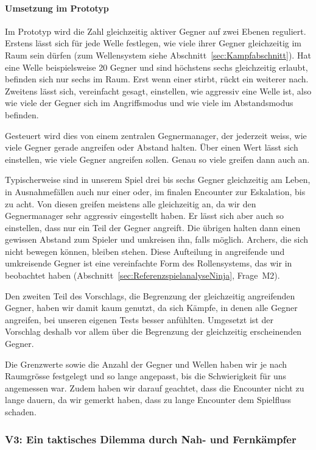 \documentclass[../Main.tex]{subfiles}
\begin{document}
\paragraph{Umsetzung im Prototyp}
Im Prototyp wird die Zahl gleichzeitig aktiver Gegner auf zwei Ebenen reguliert. Erstens lässt sich für jede Welle festlegen, wie viele ihrer Gegner gleichzeitig im Raum sein dürfen (zum Wellensystem siehe Abschnitt~\ref{sec:Kampfabschnitt}). Hat eine Welle beispielsweise 20 Gegner und sind höchstens sechs gleichzeitig erlaubt, befinden sich nur sechs im Raum. Erst wenn einer stirbt, rückt ein weiterer nach. Zweitens lässt sich, vereinfacht gesagt, einstellen, wie aggressiv eine Welle ist, also wie viele der Gegner sich im Angriffsmodus und wie viele im Abstandsmodus befinden.

Gesteuert wird dies von einem zentralen Gegnermanager, der jederzeit weiss, wie viele Gegner gerade angreifen oder Abstand halten. Über einen Wert lässt sich einstellen, wie viele Gegner angreifen sollen. Genau so viele greifen dann auch an.

Typischerweise sind in unserem Spiel drei bis sechs Gegner gleichzeitig am Leben, in Ausnahmefällen auch nur einer oder, im finalen Encounter zur Eskalation, bis zu acht. Von diesen greifen meistens alle gleichzeitig an, da wir den Gegnermanager sehr aggressiv eingestellt haben. Er lässt sich aber auch so einstellen, dass nur ein Teil der Gegner angreift. Die übrigen halten dann einen gewissen Abstand zum Spieler und umkreisen ihn, falls möglich. Archers, die sich nicht bewegen können, bleiben stehen. Diese Aufteilung in angreifende und umkreisende Gegner ist eine vereinfachte Form des Rollensystems, das wir in  beobachtet haben (Abschnitt~\ref{sec:ReferenzspielanalyseNinja}, Frage~M2).

Den zweiten Teil des Vorschlags, die Begrenzung der gleichzeitig angreifenden Gegner, haben wir damit kaum genutzt, da sich Kämpfe, in denen alle Gegner angreifen, bei unseren eigenen Tests besser anfühlten. Umgesetzt ist der Vorschlag deshalb vor allem über die Begrenzung der gleichzeitig erscheinenden Gegner.

Die Grenzwerte sowie die Anzahl der Gegner und Wellen haben wir je nach Raumgrösse festgelegt und so lange angepasst, bis die Schwierigkeit für uns angemessen war. Zudem haben wir darauf geachtet, dass die Encounter nicht zu lange dauern, da wir gemerkt haben, dass zu lange Encounter dem Spielfluss schaden.

\subsubsection{V3: Ein taktisches Dilemma durch Nah- und Fernkämpfer} \label{sec:V3}
\end{document}
